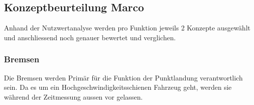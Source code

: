 \documentclass[../../main.tex]{subfiles}
\begin{document}
    \subsection{Konzeptbeurteilung Marco}
        Anhand der Nutzwertanalyse werden pro Funktion jeweils 2 Konzepte ausgewählt und
        anschliessend noch genauer bewertet und verglichen.
    \subsubsection{Bremsen}
        Die Bremsen werden Primär für die Funktion der Punktlandung verantwortlich sein. Da es um ein Hochgeschwindigkeitsschienen Fahrzeug geht, werden sie während der Zeitmessung aussen vor gelassen.
\end{document}
